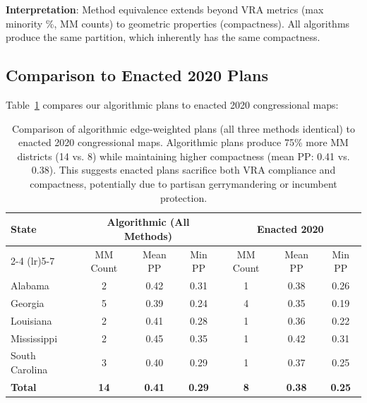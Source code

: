 \textbf{Interpretation}: Method equivalence extends beyond VRA metrics (max minority \%, MM counts) to geometric properties (compactness). All algorithms produce the same partition, which inherently has the same compactness.

\subsection{Comparison to Enacted 2020 Plans}

Table~\ref{tab:enacted-comparison-supp} compares our algorithmic plans to enacted 2020 congressional maps:

\begin{table}[h]
\centering
\small
\begin{tabular}{lcccccc}
\toprule
\multirow{2}{*}{\textbf{State}} & \multicolumn{3}{c}{\textbf{Algorithmic (All Methods)}} & \multicolumn{3}{c}{\textbf{Enacted 2020}} \\
\cmidrule(lr){2-4} \cmidrule(lr){5-7}
 & MM Count & Mean PP & Min PP & MM Count & Mean PP & Min PP \\
\midrule
Alabama & 2 & 0.42 & 0.31 & 1 & 0.38 & 0.26 \\
Georgia & 5 & 0.39 & 0.24 & 4 & 0.35 & 0.19 \\
Louisiana & 2 & 0.41 & 0.28 & 1 & 0.36 & 0.22 \\
Mississippi & 2 & 0.45 & 0.35 & 1 & 0.42 & 0.31 \\
South Carolina & 3 & 0.40 & 0.29 & 1 & 0.37 & 0.25 \\
\midrule
\textbf{Total} & \textbf{14} & \textbf{0.41} & \textbf{0.29} & \textbf{8} & \textbf{0.38} & \textbf{0.25} \\
\bottomrule
\end{tabular}
\caption{Comparison of algorithmic edge-weighted plans (all three methods identical) to enacted 2020 congressional maps. Algorithmic plans produce 75\% more MM districts (14 vs. 8) while maintaining higher compactness (mean PP: 0.41 vs. 0.38). This suggests enacted plans sacrifice both VRA compliance and compactness, potentially due to partisan gerrymandering or incumbent protection.}
\label{tab:enacted-comparison-supp}
\end{table}


